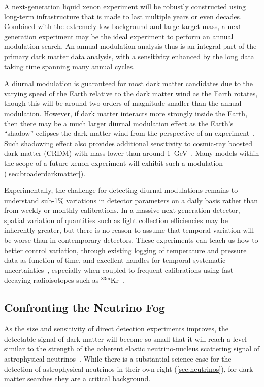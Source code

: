 A next-generation liquid xenon experiment will be robustly constructed using long-term infrastructure that is made to last multiple years or even decades. Combined with the extremely low background and large target mass, a next-generation experiment may be the ideal experiment to perform an annual modulation search. An annual modulation analysis thus is an integral part of the primary dark matter data analysis, with a sensitivity enhanced by the long data taking time spanning many annual cycles.

A diurnal modulation is guaranteed for most dark matter candidates due to the varying speed of the Earth relative to the dark matter wind as the Earth rotates, though this will be around two orders of magnitude smaller than the annual modulation. However, if dark matter interacts more strongly inside the Earth, then there may be a much larger diurnal modulation effect as the Earth's ``shadow'' eclipses the dark matter wind from the perspective of an experiment~\cite{Collar:1993ss,Hasenbalg:1997hs,Kavanagh:2016pyr,Emken:2017qmp}. Such shadowing effect also provides additional sensitivity to cosmic-ray boosted dark matter (CRDM) with mass lower than around 1~GeV~\cite{PROSPECT:2021awi}.  Many models within the scope of a future xenon experiment will exhibit such a modulation (\autoref{sec:broaderdarkmatter}).

Experimentally, the challenge for detecting diurnal modulations remains to understand sub-1\% variations in detector parameters on a daily basis rather than from weekly or monthly calibrations. In a massive next-generation detector, spatial variation of quantities such as light collection efficiencies may be inherently greater, but there is no reason to assume that temporal variation will be worse than in contemporary detectors. These experiments can teach us how to better control variation, through existing logging of temperature and pressure data as function of time, and excellent handles for temporal systematic uncertainties~\cite{Mount:2017qzi,Aprile:2017aty}, especially when coupled to frequent calibrations using fast-decaying radioisotopes such as $^{83\textrm{m}}$Kr~\cite{Kastens:2009pa, Manalaysay:2009yq}. 

\subsection{Confronting the Neutrino Fog}\label{sec:nufloor}

As the size and sensitivity of direct detection experiments improves, the detectable signal of dark matter will become so small that it will reach a level similar to the strength of the coherent elastic neutrino-nucleus scattering signal of astrophysical neutrinos~\cite{Monroe:2007xp,Strigari:2009bq,Billard:2013qya}. While there is a substantial science case for the detection of astrophysical neutrinos in their own right (\autoref{sec:neutrinos}), for dark matter searches they are a critical background.

